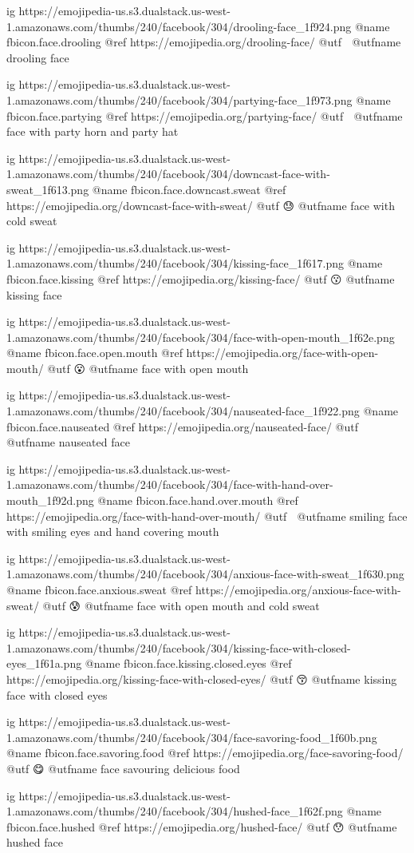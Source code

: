 	ig https://emojipedia-us.s3.dualstack.us-west-1.amazonaws.com/thumbs/240/facebook/304/drooling-face_1f924.png
	@name fbicon.face.drooling
	@ref https://emojipedia.org/drooling-face/
	@utf 🤤
	@utfname drooling face

	ig https://emojipedia-us.s3.dualstack.us-west-1.amazonaws.com/thumbs/240/facebook/304/partying-face_1f973.png
	@name fbicon.face.partying
	@ref https://emojipedia.org/partying-face/
	@utf 🥳
	@utfname face with party horn and party hat

	ig https://emojipedia-us.s3.dualstack.us-west-1.amazonaws.com/thumbs/240/facebook/304/downcast-face-with-sweat_1f613.png
	@name fbicon.face.downcast.sweat
	@ref https://emojipedia.org/downcast-face-with-sweat/
	@utf 😓
	@utfname face with cold sweat

	ig https://emojipedia-us.s3.dualstack.us-west-1.amazonaws.com/thumbs/240/facebook/304/kissing-face_1f617.png
	@name fbicon.face.kissing
	@ref https://emojipedia.org/kissing-face/
	@utf 😗
	@utfname kissing face

	ig https://emojipedia-us.s3.dualstack.us-west-1.amazonaws.com/thumbs/240/facebook/304/face-with-open-mouth_1f62e.png
	@name fbicon.face.open.mouth
	@ref https://emojipedia.org/face-with-open-mouth/
	@utf 😮
	@utfname face with open mouth

	ig https://emojipedia-us.s3.dualstack.us-west-1.amazonaws.com/thumbs/240/facebook/304/nauseated-face_1f922.png
	@name fbicon.face.nauseated
	@ref https://emojipedia.org/nauseated-face/
	@utf 🤢
	@utfname nauseated face

	ig https://emojipedia-us.s3.dualstack.us-west-1.amazonaws.com/thumbs/240/facebook/304/face-with-hand-over-mouth_1f92d.png
	@name fbicon.face.hand.over.mouth
	@ref https://emojipedia.org/face-with-hand-over-mouth/
	@utf 🤭
	@utfname smiling face with smiling eyes and hand covering mouth

	ig https://emojipedia-us.s3.dualstack.us-west-1.amazonaws.com/thumbs/240/facebook/304/anxious-face-with-sweat_1f630.png
	@name fbicon.face.anxious.sweat
	@ref https://emojipedia.org/anxious-face-with-sweat/
	@utf 😰
	@utfname face with open mouth and cold sweat

	ig https://emojipedia-us.s3.dualstack.us-west-1.amazonaws.com/thumbs/240/facebook/304/kissing-face-with-closed-eyes_1f61a.png
	@name fbicon.face.kissing.closed.eyes
	@ref https://emojipedia.org/kissing-face-with-closed-eyes/
	@utf 😚
	@utfname kissing face with closed eyes

	ig https://emojipedia-us.s3.dualstack.us-west-1.amazonaws.com/thumbs/240/facebook/304/face-savoring-food_1f60b.png
	@name fbicon.face.savoring.food
	@ref https://emojipedia.org/face-savoring-food/
	@utf 😋
	@utfname face savouring delicious food

	ig https://emojipedia-us.s3.dualstack.us-west-1.amazonaws.com/thumbs/240/facebook/304/hushed-face_1f62f.png
	@name fbicon.face.hushed
	@ref https://emojipedia.org/hushed-face/
	@utf 😯
	@utfname hushed face

\fi
